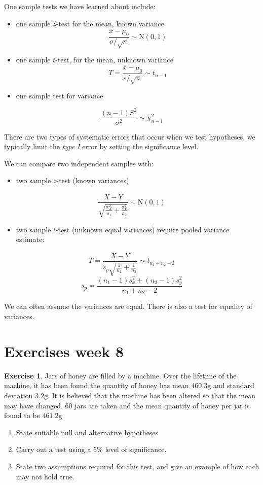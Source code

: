 \documentclass[
]{book}
\providecommand{\tightlist}{%
  \setlength{\itemsep}{0pt}\setlength{\parskip}{0pt}}
\theoremstyle{definition}
\theoremstyle{definition}
\theoremstyle{definition}
\newtheorem{exercise}{Exercise}[chapter]
\theoremstyle{definition}
\theoremstyle{remark}
\begin{document}
One sample tests we have learned about include:

\begin{itemize}
\item
  one sample \(z\)-test for the mean, known variance
  \[ \frac{\bar{x}-\mu_0}{\sigma/\sqrt{n}}\sim \text{N}(0,1) \]
\item
  one sample \(t\)-test, for the mean, unknown variance
  \[T = \frac{\bar{x}-\mu_0}{s/\sqrt{n}}\sim t_{n-1}\]
\item
  one sample test for variance
\end{itemize}

\[\frac{(n-1)S^2}{\sigma^2}\sim\chi^2_{n-1} \]

There are two types of systematic errors that occur when we test hypotheses, we typically limit the \emph{type I} error by setting the significance level.

We can compare two independent samples with:

\begin{itemize}
\tightlist
\item
  two sample \(z\)-test (known variances)
\end{itemize}

\[\frac{\bar{X} - \bar{Y}}{\sqrt{\frac{\sigma_X^2}{n_1} + \frac{\sigma_Y^2}{n_2}}}\sim \text{N}(0,1)\]

\begin{itemize}
\tightlist
\item
  two sample \(t\)-test (unknown equal variances) require pooled variance estimate:
\end{itemize}

\[T = \frac{\bar{X}-\bar{Y}}{s_p\sqrt{\frac{1}{n_1}+\frac{1}{n_2}}} \sim t_{n_1+n_2-2}\]
\[s_p = \frac{(n_1-1)s_x^2+(n_2-1)s_y^2}{n_1+n_2-2}\]

We can often assume the variances are equal. There is also a test for equality of variances.

\hypertarget{exercises-week-8}{%
\section{Exercises week 8}\label{exercises-week-8}}

\begin{exercise}

Jars of honey are filled by a machine. Over the lifetime of the machine, it has been found the quantity of honey has mean \(460.3\)g and standard deviation \(3.2\)g. It is believed that the machine has been altered so that the mean may have changed. \(60\) jars are taken and the mean quantity of honey per jar is found to be \(461.2\)g

\begin{enumerate}
\def\labelenumi{\alph{enumi})}
\item
  State suitable null and alternative hypotheses
\item
  Carry out a test using a \(5\%\) level of significance.
\item
  State two assumptions required for this test, and give an example of how each may not hold true.
\end{enumerate}

\end{exercise}
\end{document}
